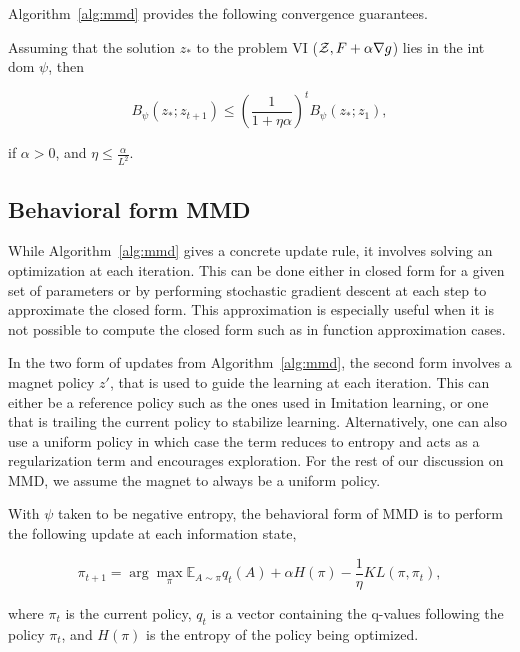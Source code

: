 Algorithm~\ref{alg:mmd} provides the following convergence guarantees.

\begin{theorem}
	\label{thm:mmdconv}
	\cite[Theorem 3.4]{sokotaUnified2023}
	Assuming that the solution $z_{\ast}$ to the problem VI ($\mathcal{Z}, F + \alpha \nabla g$) lies in the
	int dom $\psi$, then

	\[ B_{\psi} (z_{\ast}; z_{t + 1}) \leq {\left(\frac{1}{1 +
				\eta \alpha}\right)}^t B_{\psi} (z_{\ast}; z_1), \]

	if $\alpha > 0$, and $\eta
		\leq \frac{\alpha}{L^2}$.
\end{theorem}

\subsection{Behavioral form MMD}

While Algorithm~\ref{alg:mmd} gives a concrete update rule, it involves solving an optimization at
each iteration.
This can be done either in closed form for a given set of parameters or by performing stochastic
gradient descent at each step to approximate the closed form.
This approximation is especially useful when it is not possible to compute the closed form such as
in function approximation cases.

In the two form of updates from Algorithm~\ref{alg:mmd}, the second form involves a magnet policy
$z'$, that is used to guide the learning at each iteration.
This can either be a reference policy such as the ones used in Imitation learning, or one that is
trailing the current policy to stabilize learning.
Alternatively, one can also use a uniform policy in which case the term reduces to entropy and acts
as a regularization term and encourages exploration.
For the rest of our discussion on MMD, we assume the magnet to always be a uniform policy.

With $\psi$ taken to be negative entropy, the behavioral form of MMD is to perform the following
update at each information state,

\begin{equation}
	\label{eqn:mmdbf} \pi_{t+1}
	= \arg \max_{\pi} \mathbb{E}_{A \sim \pi} q_t(A) + \alpha H(\pi) - \frac{1}{\eta} KL(\pi, \pi_t),
\end{equation}

where $\pi_t$ is the current policy, $q_t$ is a vector
containing the q-values following the policy $\pi_t$, and $H(\pi)$ is the entropy of the policy
being optimized.

